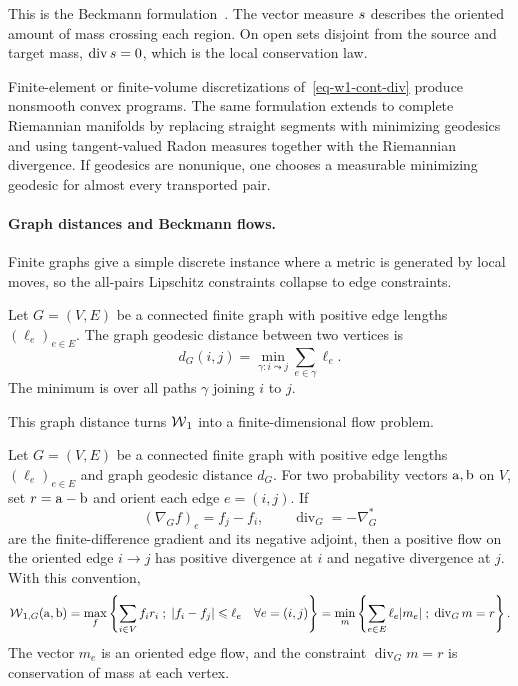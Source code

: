 This is the Beckmann formulation~\cite{Beckmann52,SantambrogioBook}. The vector measure $s$ describes the oriented amount of mass crossing each region. On open sets disjoint from the source and target mass, $\operatorname{div}s=0$, which is the local conservation law.

Finite-element or finite-volume discretizations of~\eqref{eq-w1-cont-div} produce nonsmooth convex programs. The same formulation extends to complete Riemannian manifolds by replacing straight segments with minimizing geodesics and using tangent-valued Radon measures together with the Riemannian divergence. If geodesics are nonunique, one chooses a measurable minimizing geodesic for almost every transported pair.

\paragraph{Graph distances and Beckmann flows.}
Finite graphs give a simple discrete instance where a metric is generated by local moves, so the all-pairs Lipschitz constraints collapse to edge constraints.

\begin{defn}\label{def-graph-geodesic-distance}
	Let $G=(V,E)$ be a connected finite graph with positive edge lengths $(\ell_e)_{e\in E}$. The graph geodesic distance between two vertices is
	\[
		d_G(i,j)=\min_{\gamma:i\leadsto j}\sum_{e\in\gamma}\ell_e.
	\]
	The minimum is over all paths $\gamma$ joining $i$ to $j$.
\end{defn}
This graph distance turns $\operatorname{\mathcal{W}}_1$ into a finite-dimensional flow problem.

\begin{prop}\label{prop-graph-w1-beckmann}
	Let $G=(V,E)$ be a connected finite graph with positive edge lengths $(\ell_e)_{e\in E}$ and graph geodesic distance $d_G$.
	For two probability vectors $\mathrm{a},\mathrm{b}$ on $V$, set $r=\mathrm{a}-\mathrm{b}$ and orient each edge $e=(i,j)$. If
	\[
		(\nabla_G f)_e=f_j-f_i,\qquad
		\operatorname{div}_G=-\nabla_G^*
	\]
	are the finite-difference gradient and its negative adjoint, then a positive flow on the oriented edge $i\to j$ has positive divergence at $i$ and negative divergence at $j$. With this convention,
	\[
		\operatorname{\mathcal{W}}_{1,G}(\mathrm{a},\mathrm{b})
		=
		\max_f \left\{ \sum_{i\in V} f_i r_i \;;\; |f_i-f_j|\leqslant \ell_e\quad\forall e=(i,j) \right\}
		=
		\min_m \left\{ \sum_{e\in E}\ell_e |m_e| \;;\; \operatorname{div}_G m=r \right\}.
	\]
	The vector $m_e$ is an oriented edge flow, and the constraint $\operatorname{div}_G m=r$ is conservation of mass at each vertex.
\end{prop}

